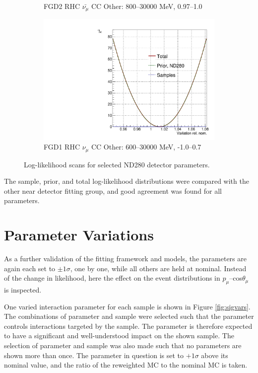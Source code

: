 \begin{figure}[!htbp]
\begin{subfigure}{.49\textwidth}
  \caption{FGD2 RHC $\bar{\nu_{\mu}}$ CC Other: 800--30000 MeV, 0.97--1.0}
\end{subfigure}
\begin{subfigure}{.49\textwidth}
  \centering
  \includegraphics[width=0.7\linewidth]{figs/llh/ndd_556_llh.pdf}
  \caption{FGD1 RHC $\nu_{\mu}$ CC Other: 600--30000 MeV, -1.0--0.7}
\end{subfigure}
\caption{Log-likelihood scans for selected ND280 detector parameters.}
\label{fig:llhdet}
\end{figure}

The sample, prior, and total log-likelihood distributions were compared with the other near detector fitting group, and good agreement was found for all parameters.

\section{Parameter Variations}\label{sec:sigvar}

As a further validation of the fitting framework and models, the parameters are again each set to $\pm1\sigma$, one by one, while all others are held at nominal. Instead of the change in likelihood, here the effect on the event distributions in $p_{\mu}$--cos$\theta_{\mu}$ is inspected. 

One varied interaction parameter for each sample is shown in Figure \ref{fig:sigvars}. The combinations of parameter and sample were selected such that the parameter controls interactions targeted by the sample. The parameter is therefore expected to have a significant and well-understood impact on the shown sample. The selection of parameter and sample was also made such that no parameters are shown more than once. The parameter in question is set to $+1\sigma$ above its nominal value, and the ratio of the reweighted MC to the nominal MC is taken.

